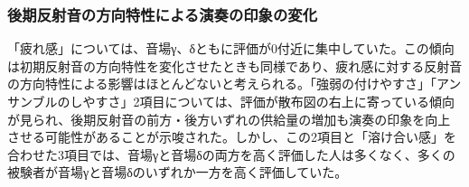 \documentclass[11pt,a4j]{jreport}
\begin{document}

\newpage
\subsubsection*{後期反射音の方向特性による演奏の印象の変化}
「疲れ感」については、音場γ、δともに評価が0付近に集中していた。この傾向は初期反射音の方向特性を変化させたときも同様であり、疲れ感に対する反射音の方向特性による影響はほとんどないと考えられる。「強弱の付けやすさ」「アンサンブルのしやすさ」2項目については、評価が散布図の右上に寄っている傾向が見られ、後期反射音の前方・後方いずれの供給量の増加も演奏の印象を向上させる可能性があることが示唆された。しかし、この2項目と「溶け合い感」を合わせた3項目では、音場γと音場δの両方を高く評価した人は多くなく、多くの被験者が音場γと音場δのいずれか一方を高く評価していた。

\end{document}
